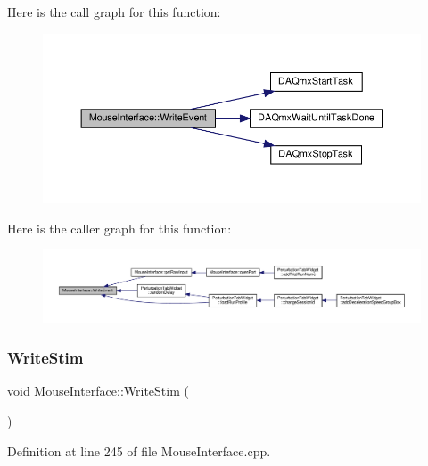 Here is the call graph for this function\+:
\nopagebreak
\begin{figure}[H]
\begin{center}
\leavevmode
\includegraphics[width=350pt]{class_mouse_interface_aa70911c968ecc9ac8b6ce7de752d3689_cgraph}
\end{center}
\end{figure}
Here is the caller graph for this function\+:
\nopagebreak
\begin{figure}[H]
\begin{center}
\leavevmode
\includegraphics[width=350pt]{class_mouse_interface_aa70911c968ecc9ac8b6ce7de752d3689_icgraph}
\end{center}
\end{figure}
\mbox{\label{class_mouse_interface_a292f829bcd243f2b462b20b83b5dc273}} 
\subsubsection{\texorpdfstring{Write\+Stim}{WriteStim}}
{\footnotesize\ttfamily void Mouse\+Interface\+::\+Write\+Stim (\begin{DoxyParamCaption}{ }\end{DoxyParamCaption})\hspace{0.3cm}{\ttfamily [slot]}}



Definition at line 245 of file Mouse\+Interface.\+cpp.

